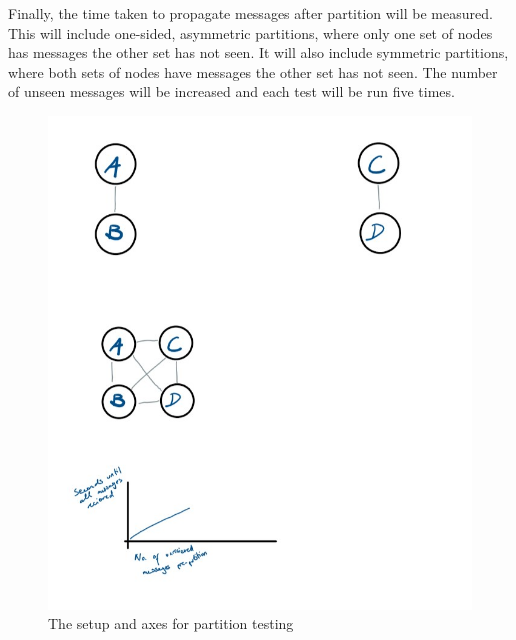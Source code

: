 \documentclass[10pt, a4paper]{article}
\begin{document}
Finally, the time taken to propagate messages after partition will be measured. This will include one-sided, asymmetric partitions, where only one set of nodes has messages the other set has not seen. It will also include symmetric partitions, where both sets of nodes have messages the other set has not seen. The number of unseen messages will be increased and each test will be run five times.

\begin{figure}[h]
\caption{The setup and axes for partition testing}
\begin{center}
\includegraphics[scale=0.3]{partition.jpg}
\end{center}
\end{figure}



\FloatBarrier
\end{document}
